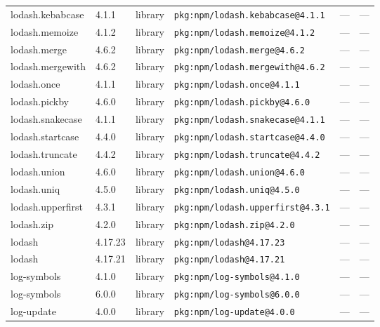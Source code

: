 \documentclass[11pt,a4paper]{article}
\begin{document}
\begin{longtable}{|p{4cm}|p{2cm}|p{1.6cm}|p{5cm}|p{1.5cm}|p{3.5cm}|}
\raggedright lodash.kebabcase & 4.1.1 & library & \small\texttt{pkg:npm/lodash.kebabcase@4.1.1} & — & \small — \\
\raggedright lodash.memoize & 4.1.2 & library & \small\texttt{pkg:npm/lodash.memoize@4.1.2} & — & \small — \\
\raggedright lodash.merge & 4.6.2 & library & \small\texttt{pkg:npm/lodash.merge@4.6.2} & — & \small — \\
\raggedright lodash.mergewith & 4.6.2 & library & \small\texttt{pkg:npm/lodash.mergewith@4.6.2} & — & \small — \\
\raggedright lodash.once & 4.1.1 & library & \small\texttt{pkg:npm/lodash.once@4.1.1} & — & \small — \\
\raggedright lodash.pickby & 4.6.0 & library & \small\texttt{pkg:npm/lodash.pickby@4.6.0} & — & \small — \\
\raggedright lodash.snakecase & 4.1.1 & library & \small\texttt{pkg:npm/lodash.snakecase@4.1.1} & — & \small — \\
\raggedright lodash.startcase & 4.4.0 & library & \small\texttt{pkg:npm/lodash.startcase@4.4.0} & — & \small — \\
\raggedright lodash.truncate & 4.4.2 & library & \small\texttt{pkg:npm/lodash.truncate@4.4.2} & — & \small — \\
\raggedright lodash.union & 4.6.0 & library & \small\texttt{pkg:npm/lodash.union@4.6.0} & — & \small — \\
\raggedright lodash.uniq & 4.5.0 & library & \small\texttt{pkg:npm/lodash.uniq@4.5.0} & — & \small — \\
\raggedright lodash.upperfirst & 4.3.1 & library & \small\texttt{pkg:npm/lodash.upperfirst@4.3.1} & — & \small — \\
\raggedright lodash.zip & 4.2.0 & library & \small\texttt{pkg:npm/lodash.zip@4.2.0} & — & \small — \\
\raggedright lodash & 4.17.23 & library & \small\texttt{pkg:npm/lodash@4.17.23} & — & \small — \\
\raggedright lodash & 4.17.21 & library & \small\texttt{pkg:npm/lodash@4.17.21} & — & \small — \\
\raggedright log-symbols & 4.1.0 & library & \small\texttt{pkg:npm/log-symbols@4.1.0} & — & \small — \\
\raggedright log-symbols & 6.0.0 & library & \small\texttt{pkg:npm/log-symbols@6.0.0} & — & \small — \\
\raggedright log-update & 4.0.0 & library & \small\texttt{pkg:npm/log-update@4.0.0} & — & \small — \\

\end{longtable}
\end{document}
